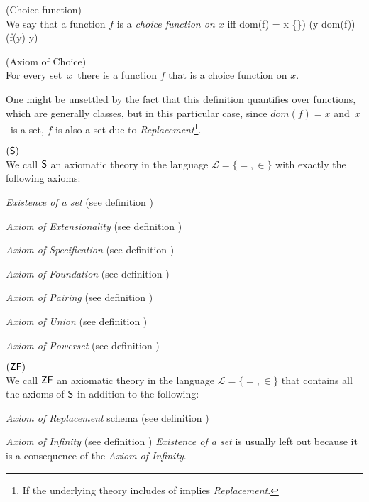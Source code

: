 \begin{definition}{(Choice function)}\label{def:choice_function}\\
We say that a function $f$ is a \emph{choice function on $x$} iff
\beq
dom(f) = x \setminus \{\emptyset\}) \et (\forall y \in dom(f))(f(y) \in y)
\eeq
\end{definition}


\begin{definition}{(Axiom of Choice)}\label{def:choice}\\
For every set~$x$~there is a function $f$ that is a choice function on $x$.
\end{definition}
One might be unsettled by the fact that this definition quantifies over functions, which are generally classes, but in this particular case, since $dom(f) = x$ and~$x$~is a set, $f$ is also a set due to \emph{Replacement}\footnote{If the underlying theory includes of implies \emph{Replacement}.}.


\begin{definition}{$(\sf{S})$}\label{def:s}\\ %
We call $\sf{S}$ an axiomatic theory in the language $\mathscr{L} = \{=, \in\}$ with exactly the following axioms:
\bce[(i)]
\item \emph{Existence of a set} (see definition )
\item \emph{Axiom of Extensionality} (see definition )
\item \emph{Axiom of Specification} (see definition )
\item \emph{Axiom of Foundation} (see definition )
\item \emph{Axiom of Pairing} (see definition )
\item \emph{Axiom of Union} (see definition )
\item \emph{Axiom of Powerset} (see definition )
\ece
\end{definition}

\begin{definition}{$(\sf{ZF})$}\label{def:zf}\\ %
We call $\sf{ZF}$ an axiomatic theory in the language $\mathscr{L} = \{=, \in\}$ that contains all the axioms of $\sf{S}$ in addition to the following:
\bce[(i)]
\item \emph{Axiom of Replacement} schema (see definition )
\item \emph{Axiom of Infinity} (see definition )
\ece
\emph{Existence of a set} is usually left out because it is a consequence of the \emph{Axiom of Infinity}.
\end{definition}

